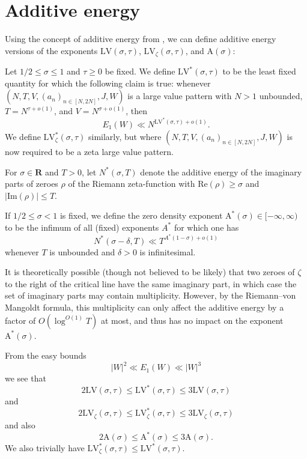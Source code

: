 \documentclass[a4paper, 10pt]{amsart}
\newcommand{\R}{\mathbf{R}}
\newcommand{\LV}{\mathrm{LV}}
\newcommand{\A}{\mathrm{A}}
\begin{document}
\section{Additive energy}

Using the concept of additive energy from , we can define additive energy versions of the exponents $\LV(\sigma,\tau)$, $\LV_\zeta(\sigma,\tau)$, and $\A(\sigma)$:

\begin{definition}\label{lve-def} Let $1/2 \leq \sigma \leq 1$ and $\tau \geq 0$ be fixed. We define $\LV^*(\sigma,\tau)$ to be the least fixed quantity for which the following claim is true: whenever $(N,T,V,(a_n)_{n \in [N,2N]},J,W)$ is a large value pattern with $N>1$ unbounded, $T = N^{\tau+o(1)}$, and $V = N^{\sigma+o(1)}$, then
    $$ E_1(W) \ll N^{\LV^*(\sigma,\tau)+o(1)}.$$
    We define $\LV^*_\zeta(\sigma,\tau)$ similarly, but where $(N,T,V,(a_n)_{n \in [N,2N]},J,W)$ is now required to be a zeta large value pattern.
\end{definition}

\begin{definition}\label{zeroe-def}  For $\sigma \in \R$ and $T>0$, let $N^*(\sigma,T)$ denote the additive energy of the imaginary parts of zeroes $\rho$ of the Riemann zeta-function with $\mathrm{Re}(\rho) \geq \sigma$ and $|\mathrm{Im}(\rho)| \leq T$.

If $1/2 \leq \sigma < 1$ is fixed, we define the zero density exponent $\A^*(\sigma) \in [-\infty,\infty)$ to be the infimum of all (fixed) exponents $A^*$ for which one has
        $$ N^*(\sigma-\delta,T) \ll T^{A^* (1-\sigma)+o(1)}$$
    whenever $T$ is unbounded and $\delta>0$ is infinitesimal.
\end{definition}

\begin{remark}  It is theoretically possible (though not believed to be likely) that two zeroes of $\zeta$ to the right of the critical line have the same imaginary part, in which case the set of imaginary parts may contain multiplicity.  However, by the Riemann--von Mangoldt formula, this multiplicity can only affect the additive energy by a factor of $O(\log^{O(1)} T)$ at most, and thus has no impact on the exponent $\A^*(\sigma)$.
\end{remark}

From the easy bounds
$$ |W|^2 \ll E_1(W) \ll |W|^3$$
we see that
\begin{equation}\label{lve-triv}
    2\LV(\sigma,\tau) \leq \LV^*(\sigma,\tau) \leq 3\LV(\sigma,\tau)
\end{equation}
and
$$ 2\LV_\zeta(\sigma,\tau) \leq \LV^*_\zeta(\sigma,\tau) \leq 3\LV_\zeta(\sigma,\tau)$$
and also
$$ 2\A(\sigma) \leq \A^*(\sigma) \leq 3\A(\sigma).$$
We also trivially have $\LV^*_\zeta(\sigma,\tau) \leq \LV^*(\sigma,\tau)$.
\end{document}
